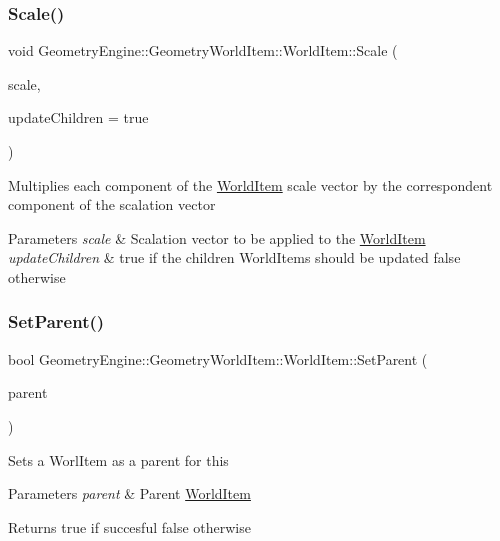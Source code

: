 \subsubsection{\texorpdfstring{Scale()}{Scale()}}
{\footnotesize\ttfamily void Geometry\+Engine\+::\+Geometry\+World\+Item\+::\+World\+Item\+::\+Scale (\begin{DoxyParamCaption}\item[{const Q\+Vector3D \&}]{scale,  }\item[{bool}]{update\+Children = {\ttfamily true} }\end{DoxyParamCaption})}

Multiplies each component of the \mbox{\hyperlink{class_geometry_engine_1_1_geometry_world_item_1_1_world_item}{World\+Item}} scale vector by the correspondent component of the scalation vector 
\begin{DoxyParams}{Parameters}
{\em scale} & Scalation vector to be applied to the \mbox{\hyperlink{class_geometry_engine_1_1_geometry_world_item_1_1_world_item}{World\+Item}} \\
\hline
{\em update\+Children} & true if the children World\+Items should be updated false otherwise \\
\hline
\end{DoxyParams}
\mbox{\label{class_geometry_engine_1_1_geometry_world_item_1_1_world_item_acb8c065c43621ce13f95205129a1d686}} 
\subsubsection{\texorpdfstring{SetParent()}{SetParent()}}
{\footnotesize\ttfamily bool Geometry\+Engine\+::\+Geometry\+World\+Item\+::\+World\+Item\+::\+Set\+Parent (\begin{DoxyParamCaption}\item[{\mbox{\hyperlink{class_geometry_engine_1_1_geometry_world_item_1_1_world_item}{World\+Item}} $\ast$}]{parent }\end{DoxyParamCaption})}

Sets a Worl\+Item as a parent for this 
\begin{DoxyParams}{Parameters}
{\em parent} & Parent \mbox{\hyperlink{class_geometry_engine_1_1_geometry_world_item_1_1_world_item}{World\+Item}} \\
\hline
\end{DoxyParams}
\begin{DoxyReturn}{Returns}
true if succesful false otherwise 
\end{DoxyReturn}
\mbox{\label{class_geometry_engine_1_1_geometry_world_item_1_1_world_item_a81a1c5d0a550a56cc89d7e4e7f3c5c49}} 
